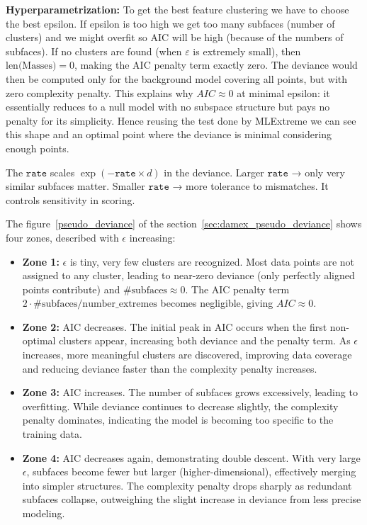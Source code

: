 \documentclass[11pt]{article}
\begin{document}
\textbf{Hyperparametrization:}
To get the best feature clustering we have to choose the best epsilon. If epsilon is too high we get too many subfaces (number of clusters) and we might overfit so AIC will be high (because of the numbers of subfaces). If no clusters are found (when $\varepsilon$ is extremely small), then $\text{len(Masses)} = 0$, making the AIC penalty term exactly zero. The deviance would then be computed only for the background model covering all points, but with zero complexity penalty. This explains why $AIC \approx 0$ at minimal epsilon: it essentially reduces to a null model with no subspace structure but pays no penalty for its simplicity. Hence reusing the test done by MLExtreme \cite{mlextreme2023} we can see this shape and an optimal point where the deviance is minimal considering enough points. 

The $\texttt{rate}$ scales $\exp(-\texttt{rate} \times d)$ in the deviance. Larger $\texttt{rate}$ → only very similar subfaces matter. Smaller $\texttt{rate}$ → more tolerance to mismatches. It controls sensitivity in scoring.

The figure~\ref{pseudo_deviance} of the section~\ref{sec:damex_pseudo_deviance} shows four zones, described with $\epsilon$ increasing:
\begin{itemize}
    \item \textbf{Zone 1:} $\epsilon$ is tiny, very few clusters are recognized. Most data points are not assigned to any cluster, leading to near-zero deviance (only perfectly aligned points contribute) and $\#\text{subfaces} \approx 0$. The AIC penalty term $2 \cdot \#\text{subfaces}/\text{number\_extremes}$ becomes negligible, giving $AIC \approx 0$.
    
    \item \textbf{Zone 2:} AIC decreases. The initial peak in AIC occurs when the first non-optimal clusters appear, increasing both deviance and the penalty term. As $\epsilon$ increases, more meaningful clusters are discovered, improving data coverage and reducing deviance faster than the complexity penalty increases.
    
    \item \textbf{Zone 3:} AIC increases. The number of subfaces grows excessively, leading to overfitting. While deviance continues to decrease slightly, the complexity penalty dominates, indicating the model is becoming too specific to the training data.
    
    \item \textbf{Zone 4:} AIC decreases again, demonstrating double descent. With very large $\epsilon$, subfaces become fewer but larger (higher-dimensional), effectively merging into simpler structures. The complexity penalty drops sharply as redundant subfaces collapse, outweighing the slight increase in deviance from less precise modeling.
\end{itemize}
\end{document}
